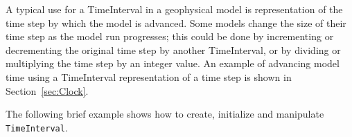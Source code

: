 
A typical use for a TimeInterval in a geophysical model 
is representation of the time step by which the model is 
advanced.  Some models change the size of their time step as 
the model run progresses; this could
be done by incrementing or decrementing the original time 
step by another TimeInterval, or by dividing or multiplying
the time step by an integer value.  An example of advancing 
model time using a TimeInterval representation of a time
step is shown in Section~\ref{sec:Clock}.

The following brief example shows how to create, initialize 
and manipulate {\tt TimeInterval}.



